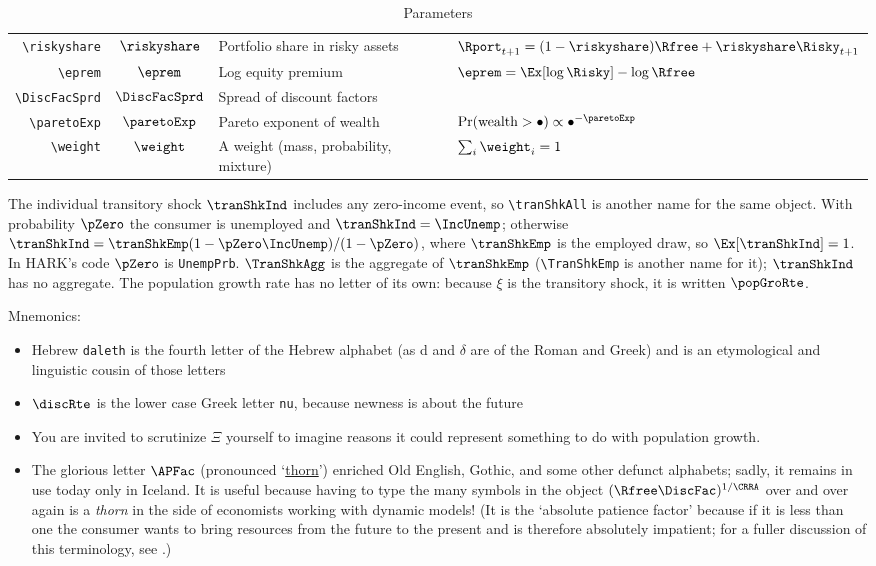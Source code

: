 \documentclass{econark}
\begin{document}
\begin{table}[ht]
\begin{tabular}{|>{\ttfamily}rcll|}
    \\ \verb|\riskyshare|  & $\riskyshare$ & Portfolio share in risky assets & $\Rport_{t+1}=(1-\riskyshare)\Rfree+\riskyshare\Risky_{t+1}$
    \\ \verb|\eprem|       & $\eprem$      & Log equity premium & $\eprem=\Ex[\log\Risky]-\log\Rfree$
    \\ \verb|\DiscFacSprd| & $\DiscFacSprd$ & Spread of discount factors &
    \\ \verb|\paretoExp|   & $\paretoExp$  & Pareto exponent of wealth & $\Pr(\text{wealth}>\bullet)\propto\bullet^{-\paretoExp}$
    \\ \verb|\weight|      & $\weight$     & A weight (mass, probability, mixture) & $\sum_{i}\weight_{i}=1$
    \\	\hline
  \end{tabular}
  \caption{Parameters}
  \label{table:Parameters}
\end{table}

The individual transitory shock $\tranShkInd$ includes any zero-income event, so \verb|\tranShkAll| is another name for the same object.  With probability $\pZero$ the consumer is unemployed and $\tranShkInd=\IncUnemp$; otherwise $\tranShkInd=\tranShkEmp(1-\pZero\IncUnemp)/(1-\pZero)$, where $\tranShkEmp$ is the employed draw, so $\Ex[\tranShkInd]=1$.  In HARK's code $\pZero$ is \texttt{UnempPrb}.  $\TranShkAgg$ is the aggregate of $\tranShkEmp$ (\verb|\TranShkEmp| is another name for it); $\tranShkInd$ has no aggregate.  The population growth rate has no letter of its own: because $\xi$ is the transitory shock, it is written $\popGroRte$.

Mnemonics:
\begin{itemize}
\item Hebrew \texttt{daleth} is the fourth letter of the Hebrew alphabet (as d and $\delta$ are of the Roman and Greek) and is an etymological and linguistic cousin of those letters
\item $\discRte$ is the lower case Greek letter \texttt{nu}, because newness is about the future
\item You are invited to scrutinize $\Xi$ yourself to imagine reasons it could represent something to do with population growth.
\item The glorious letter $\APFac$ (pronounced `\href{https://en.wikipedia.org/wiki/Thorn_(letter)}{thorn}') enriched Old English, Gothic, and some other defunct alphabets; sadly, it remains in use today only in Iceland.  It is useful because having to type the many symbols in the object $(\Rfree \DiscFac)^{1/\CRRA}$ over and over again is a \textit{thorn} in the side of economists working with dynamic models!  (It is the `absolute patience factor' because if it is less than one the consumer wants to bring resources from the future to the present and is therefore absolutely impatient; for a fuller discussion of this terminology, see \cite{carrollTractable}.)
\end{itemize}
\end{document}
